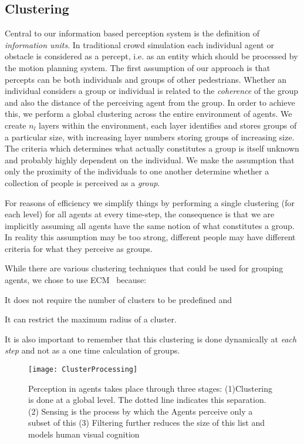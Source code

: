\subsection{Clustering}
\label{IBP:Clustering}
Central to our information based perception system is the definition of \emph{information units}. In traditional crowd simulation each individual agent or obstacle is considered as a percept, i.e. as an entity which should be processed by the motion planning system. The first assumption of our approach is that percepts can be both individuals and groups of other pedestrians. Whether an individual considers a group or individual is related to the {\em coherence} of the group and also the distance of the perceiving agent from the group. In order to achieve this, we perform a global clustering across the entire environment of agents. We create $n_l$ layers within the environment, each layer identifies and stores groups of a particular size, with increasing layer numbers storing groups of increasing size. The criteria which determines what actually constitutes a group is itself unknown and probably highly dependent on the individual. We make the assumption that only the proximity of the individuals to one another determine whether a collection of people is perceived as a {\em group}.

For reasons of efficiency we simplify things by performing a single clustering (for each level) for all agents at every time-step, the consequence is that we are implicitly assuming all agents have the same notion of what constitutes a group. In reality this assumption may be too strong, different people may have different criteria for what they perceive as groups.

While there are various clustering techniques that could be used for grouping agents, we chose to use ECM~\cite{Song:2001vg} because:
\begin{inparaenum}
\item It does not require the number of clusters to be predefined and
\item It can restrict the maximum radius of a cluster.
\end{inparaenum}
It is also important to remember that this clustering is done dynamically at \emph{each step} and not as a one time calculation of groups.


\begin{figure}[!t]
\centering
\texttt{[image: ClusterProcessing]}
\caption[Breakdown of the Perception Process]{Perception in agents takes place through three stages: (1)Clustering is done at a global level. The dotted line indicates this separation. (2) Sensing is the process by which the Agents perceive only a subset of this (3) Filtering further reduces the size of this list and models human visual cognition}
\label{fig:AgentClusteredPerception}
\end{figure}

